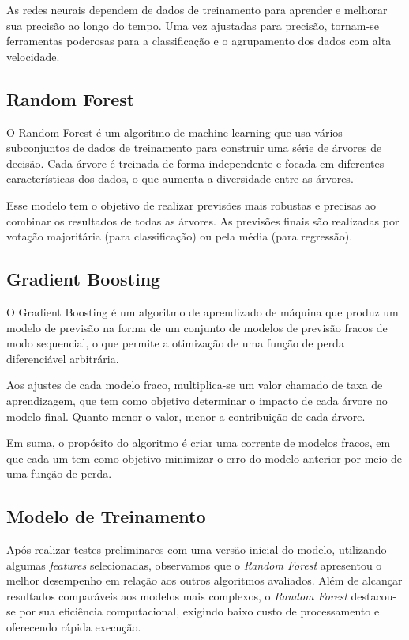 \documentclass{article}
\begin{document}
As redes neurais dependem de dados de treinamento para aprender e melhorar sua precisão ao longo do tempo. Uma vez ajustadas para precisão, tornam-se ferramentas poderosas para a classificação e o agrupamento dos dados com alta velocidade. 

\subsection{Random Forest}

O Random Forest é um algoritmo de machine learning que usa vários subconjuntos de dados de treinamento para construir uma série de árvores de decisão. Cada árvore é treinada de forma independente e focada em diferentes características dos dados, o que aumenta a diversidade entre as árvores.

Esse modelo tem o objetivo de realizar previsões mais robustas e precisas ao combinar os resultados de todas as árvores. As previsões finais são realizadas por votação majoritária (para classificação) ou pela média (para regressão).

\subsection{Gradient Boosting}

O Gradient Boosting é um algoritmo de aprendizado de máquina que produz um modelo de previsão na forma de um conjunto de modelos de previsão fracos de modo sequencial, o que permite a otimização de uma função de perda diferenciável arbitrária.

Aos ajustes de cada modelo fraco, multiplica-se um valor chamado de taxa de aprendizagem, que tem como objetivo determinar o impacto de cada árvore no modelo final. Quanto menor o valor, menor a contribuição de cada árvore.

Em suma, o propósito do algoritmo é criar uma corrente de modelos fracos, em que cada um tem como objetivo minimizar o erro do modelo anterior por meio de uma função de perda.

\subsection{Modelo de Treinamento}

Após realizar testes preliminares com uma versão inicial do modelo, utilizando algumas \textit{features} selecionadas, observamos que o \textit{Random Forest} apresentou o melhor desempenho em relação aos outros algoritmos avaliados. Além de alcançar resultados comparáveis aos modelos mais complexos, o \textit{Random Forest} destacou-se por sua eficiência computacional, exigindo baixo custo de processamento e oferecendo rápida execução. 
\end{document}
